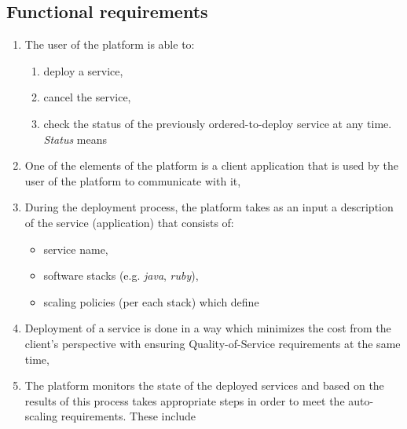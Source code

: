\subsection{Functional requirements}
\begin{enumerate}
  \item The user of the platform is able to:
    \begin{enumerate}
      \item deploy a service,
      \item cancel the service,
      \item check the status of the previously ordered-to-deploy service at any time. \emph{Status} means 
    \end{enumerate}
  \item One of the elements of the platform is a client application that is used by the user of the platform to communicate with it,
  \item During the deployment process, the platform takes as an input a description of the service (application) that consists of:
    \begin{itemize}
    \item service name,
    \item software stacks (e.g. \emph{java}, \emph{ruby}),
    \item scaling policies (per each stack) which define
    \end{itemize}
  \item Deployment of a service is done in a way which minimizes the cost from the client's perspective with ensuring Quality-of-Service requirements at the same time,
  \item The platform monitors the state of the deployed services and based on the results of this process takes appropriate steps in order to meet the auto-scaling requirements. These include
\end{enumerate}

